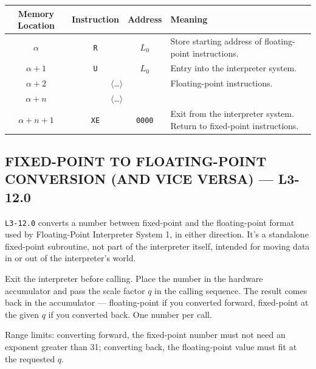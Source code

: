\begin{table}[h!]
\centering
\begin{tabularx}{\textwidth}{cccX}
\toprule
\textbf{Memory Location} & \textbf{Instruction} & \textbf{Address} & \textbf{Meaning} \\
\midrule
$\alpha$             & \texttt{R}                    & $L_0$            & Store starting address of floating-point instructions. \\
$\alpha+1$           & \texttt{U}                    & $L_0$            & Entry into the interpreter system. \\
$\alpha+2$           & \multicolumn{2}{c}{$\langle$\dots$\rangle$}              & Floating-point instructions. \\
$\alpha+n$           & \multicolumn{2}{c}{$\langle$\dots$\rangle$}              & \\
$\alpha+n+1$         & \texttt{XE}                   & \texttt{0000}             & Exit from the interpreter system. Return to fixed-point instructions. \\
\bottomrule
\end{tabularx}
\end{table}



\subsection*{FIXED-POINT TO FLOATING-POINT CONVERSION (AND VICE VERSA) --- L3-12.0}

\texttt{L3-12.0} converts a number between fixed-point and the floating-point format used by Floating-Point Interpreter System 1, in either direction. It's a standalone fixed-point subroutine, not part of the interpreter itself, intended for moving data in or out of the interpreter's world.

Exit the interpreter before calling. Place the number in the hardware accumulator and pass the scale factor $q$ in the calling sequence. The result comes back in the accumulator --- floating-point if you converted forward, fixed-point at the given $q$ if you converted back. One number per call.

Range limits: converting forward, the fixed-point number must not need an exponent greater than 31; converting back, the floating-point value must fit at the requested $q$.

